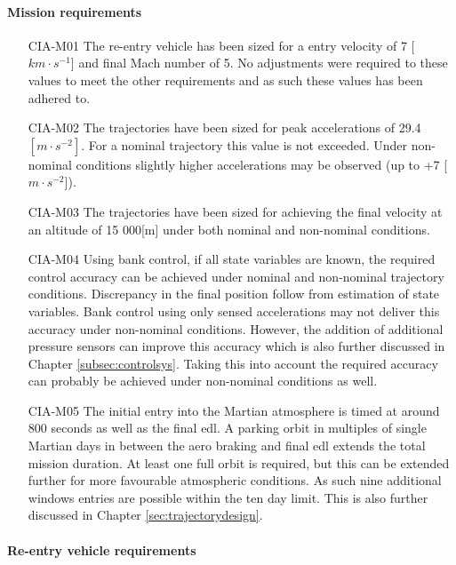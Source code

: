 \paragraph{Mission requirements}
\begin{itemize}[leftmargin=+20mm]
\item[CIA-M01]	The re-entry vehicle has been sized for a entry velocity of 7 [$km \cdot s^{-1}$] and final Mach number of 5. No adjustments were required to these values to meet the other requirements and as such these values has been adhered to. 
\item[CIA-M02]	The trajectories have been sized for peak accelerations of 29.4 $[m \cdot s^{-2}]$. For a nominal trajectory this value is not exceeded. Under non-nominal conditions slightly higher accelerations may be observed (up to +7 [$m \cdot s ^{-2}$]). 
\item[CIA-M03]  The trajectories have been sized for achieving the final velocity at an altitude of 15 000[m] under both nominal and non-nominal conditions.
\item[CIA-M04]	Using bank control, if all state variables are known, the required control accuracy can be achieved under nominal and non-nominal trajectory conditions. Discrepancy in the final position follow from estimation of state variables. Bank control using only sensed accelerations may not deliver this accuracy under non-nominal conditions. However, the addition of additional pressure sensors can improve this accuracy which is also further discussed in Chapter \ref{subsec:controlsys}. Taking this into account the required accuracy can probably be achieved under non-nominal conditions as well.
\item[CIA-M05] The initial entry into the Martian atmosphere is timed at around 800 seconds as well as the final \gls{edl}. A parking orbit in multiples of single Martian days in between the aero braking and final \gls{edl} extends the total mission duration. At least one full orbit is required, but this can be extended further for more favourable atmospheric conditions. As such nine additional windows entries are possible within the ten day limit. This is also further discussed  in Chapter \ref{sec:trajectorydesign}.

\end{itemize}

\paragraph{Re-entry vehicle requirements}


